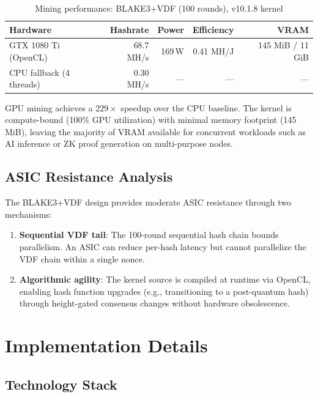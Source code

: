 \documentclass[11pt,a4paper]{article}
\begin{document}
\begin{table}[h]
\centering
\begin{tabular}{|l|r|r|r|r|}
\hline
\textbf{Hardware} & \textbf{Hashrate} & \textbf{Power} & \textbf{Efficiency} & \textbf{VRAM} \\
\hline
GTX 1080 Ti (OpenCL) & 68.7 MH/s & 169\,W & 0.41 MH/J & 145 MiB / 11 GiB \\
CPU fallback (4 threads) & 0.30 MH/s & --- & --- & --- \\
\hline
\end{tabular}
\caption{Mining performance: BLAKE3+VDF (100 rounds), v10.1.8 kernel}
\end{table}

GPU mining achieves a $229\times$ speedup over the CPU baseline. The kernel is compute-bound (100\% GPU utilization) with minimal memory footprint (145\,MiB), leaving the majority of VRAM available for concurrent workloads such as AI inference or ZK proof generation on multi-purpose nodes.

\subsection{ASIC Resistance Analysis}

The BLAKE3+VDF design provides moderate ASIC resistance through two mechanisms:

\begin{enumerate}
    \item \textbf{Sequential VDF tail}: The 100-round sequential hash chain bounds parallelism. An ASIC can reduce per-hash latency but cannot parallelize the VDF chain within a single nonce.
    \item \textbf{Algorithmic agility}: The kernel source is compiled at runtime via OpenCL, enabling hash function upgrades (e.g., transitioning to a post-quantum hash) through height-gated consensus changes without hardware obsolescence.
\end{enumerate}

\section{Implementation Details}

\subsection{Technology Stack}
\end{document}
